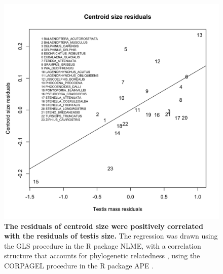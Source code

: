 \documentclass[12pt]{article}
\begin{document}
\begin{figure}
\begin{center}
  \includegraphics[width=\textwidth]{S6}
\end{center}
\caption{
\textbf{The residuals of centroid size were positively correlated with the
residuals of testis size.} The regression was drawn using the GLS procedure in the R package NLME,
with a correlation structure that accounts for phylogenetic relatedness \citep{pagel1999}, using the CORPAGEL
procedure in the R package APE \citep{paradis2004}.
}
\end{figure}


\end{document}
